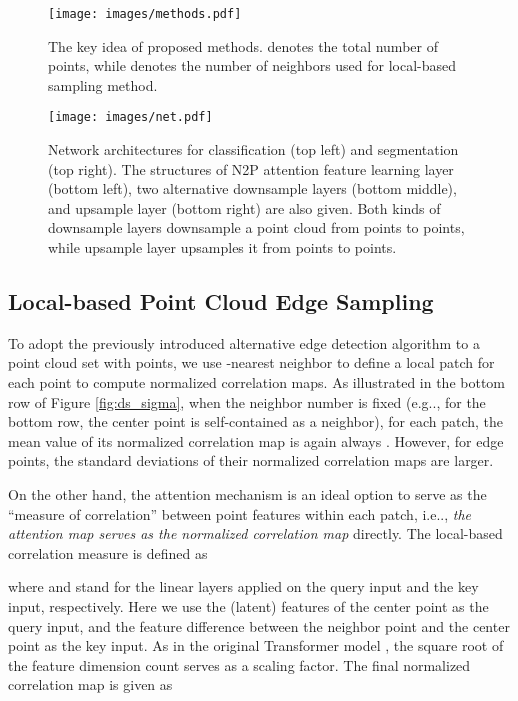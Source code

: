 \documentclass[10pt,twocolumn,letterpaper]{article}
\makeatletter
\DeclareRobustCommand\onedot{\futurelet\@let@token\@onedot}
\def\@onedot{\ifx\@let@token.\else.\null\fi\xspace}
\def\eg{e.g\onedot} \def\Eg{E.g\onedot}
\def\ie{i.e\onedot} \def\Ie{I.e\onedot}
\makeatother
\begin{document}
\begin{figure}[t]
    \centering
    \texttt{[image: images/methods.pdf]}
    \caption{The key idea of proposed methods.  denotes the total number of points, while  denotes the number of neighbors used for local-based sampling method. \vspace{-0.2cm}}
    \label{fig:methods}
\end{figure}

\begin{figure*}[t]
    \centering
    \texttt{[image: images/net.pdf]}
    \caption{Network architectures for classification (top left) and segmentation (top right). The structures of N2P attention feature learning layer (bottom left), two alternative downsample layers (bottom middle), and upsample layer (bottom right) are also given. Both kinds of downsample layers downsample a point cloud from  points to  points, while upsample layer upsamples it from  points to  points.}
    \label{fig:net}
\end{figure*}


\subsection{Local-based Point Cloud Edge Sampling}
To adopt the previously introduced alternative edge detection algorithm to a point cloud set with  points, we use -nearest neighbor to define a local patch  for each point  to compute normalized correlation maps. 
As illustrated in the bottom row of Figure \ref{fig:ds_sigma}, when the neighbor number  is fixed (\eg,  for the bottom row, the center point is self-contained as a neighbor), for each patch, the mean value of its normalized correlation map is again always . However, for edge points, the standard deviations of their normalized correlation maps are larger.

On the other hand, the attention mechanism is an ideal option to serve as the \enquote{measure of correlation} between point features within each patch, \ie, \emph{the attention map serves as the normalized correlation map} directly. The local-based correlation measure  is defined as

where  and  stand for the linear layers applied on the query input and the key input, respectively. Here we use the (latent) features of the center point  as the query input, and the feature difference between the neighbor point and the center point  as the key input. 
As in the original Transformer model \cite{vaswani2017attention}, the square root of the feature dimension count   serves as a scaling factor.
The final normalized correlation map  is given as
\end{document}
